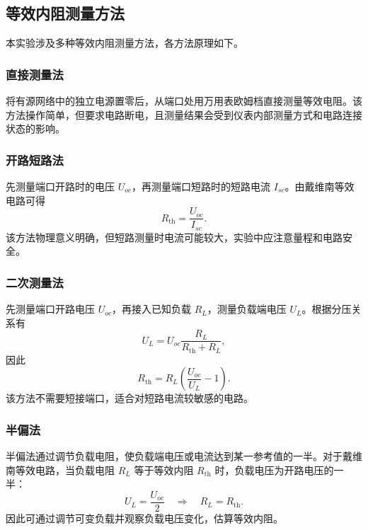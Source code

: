 \documentclass[12pt]{ctexart}
\begin{document}
\subsection{等效内阻测量方法}

本实验涉及多种等效内阻测量方法，各方法原理如下。

\subsubsection{直接测量法}

将有源网络中的独立电源置零后，从端口处用万用表欧姆档直接测量等效电阻。该方法操作简单，但要求电路断电，且测量结果会受到仪表内部测量方式和电路连接状态的影响。

\subsubsection{开路短路法}

先测量端口开路时的电压 \(U_{oc}\)，再测量端口短路时的短路电流 \(I_{sc}\)。由戴维南等效电路可得
\begin{equation}
    R_{\mathrm{th}}=\frac{U_{oc}}{I_{sc}}.
\end{equation}
该方法物理意义明确，但短路测量时电流可能较大，实验中应注意量程和电路安全。

\subsubsection{二次测量法}

先测量端口开路电压 \(U_{oc}\)，再接入已知负载 \(R_L\)，测量负载端电压 \(U_L\)。根据分压关系有
\begin{equation}
    U_L = U_{oc}\frac{R_L}{R_{\mathrm{th}}+R_L},
\end{equation}
因此
\begin{equation}
    R_{\mathrm{th}}=R_L\left(\frac{U_{oc}}{U_L}-1\right).
\end{equation}
该方法不需要短接端口，适合对短路电流较敏感的电路。

\subsubsection{半偏法}

半偏法通过调节负载电阻，使负载端电压或电流达到某一参考值的一半。对于戴维南等效电路，当负载电阻 \(R_L\) 等于等效内阻 \(R_{\mathrm{th}}\) 时，负载电压为开路电压的一半：
\begin{equation}
    U_L=\frac{U_{oc}}{2}\quad\Longrightarrow\quad R_L=R_{\mathrm{th}}.
\end{equation}
因此可通过调节可变负载并观察负载电压变化，估算等效内阻。
\end{document}
